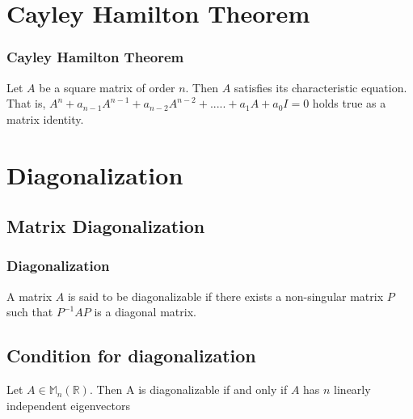 \documentclass[10pt]{beamer}
\begin{document}
\section{Cayley Hamilton Theorem}
\begin{frame}
\frametitle{Cayley Hamilton Theorem}
\begin{theorem}
Let $A$ be a square matrix of order $n$. Then $A$
satisfies its characteristic equation. That is,
$A^n + a_{n-1} A^{n-1} + a_{n-2} A^{n-2} + ..... +  a_1A + a_0I = 0$
holds true as a matrix identity.
\end{theorem}
\end{frame}
\section{Diagonalization}
\subsection{Matrix Diagonalization}
\begin{frame}
\frametitle{Diagonalization}
\begin{definition}
A matrix $A$ is said to be diagonalizable if there exists
a non-singular matrix $P$ such that $P^{-1} AP$ is a diagonal matrix.
\end{definition}
\subsection{Condition for diagonalization}
\begin{theorem}
Let $A \in \mathbb{M}_n(\mathbb{R})$. Then A is diagonalizable if and only if $A$ has $n$ linearly independent eigenvectors
\end{theorem}
\end{frame}
\end{document}
